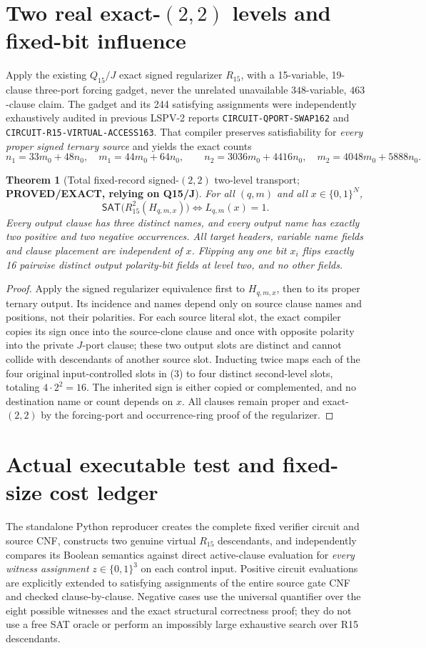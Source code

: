 \documentclass[11pt]{article}
\newtheorem{theorem}{Theorem}
\newcommand{\SAT}{\mathsf{SAT}}
\begin{document}
\section{Two real exact-$(2,2)$ levels and fixed-bit influence}
Apply the existing $Q_{15}/J$ exact signed regularizer $R_{15}$, with a 15-variable, 19-clause three-port forcing gadget, never the unrelated unavailable $348$-variable, $463$-clause claim. The gadget and its 244 satisfying assignments were independently exhaustively audited in previous LSPV-2 reports \texttt{CIRCUIT-QPORT-SWAP162} and \texttt{CIRCUIT-R15-VIRTUAL-ACCESS163}. That compiler preserves satisfiability for \emph{every proper signed ternary source} and yields the exact counts
\[
 n_1=33m_0+48n_0,\quad m_1=44m_0+64n_0,\qquad
 n_2=3036m_0+4416n_0,\quad m_2=4048m_0+5888n_0.\tag{6}
\]
\begin{theorem}[Total fixed-record signed-$(2,2)$ two-level transport; \textbf{PROVED/EXACT, relying on Q15/J}]
For all $(q,m)$ and all $x\in\{0,1\}^N$,
\[
 \SAT\bigl(R_{15}^2(H_{q,m,x})\bigr)\iff L_{q,m}(x)=1.\tag{7}
\]
Every output clause has three distinct names, and every output name has exactly two positive and two negative occurrences. All target headers, variable name fields and clause placement are independent of $x$. Flipping any one bit $x_i$ flips \emph{exactly 16} pairwise distinct output polarity-bit fields at level two, and no other fields.
\end{theorem}
\begin{proof}
Apply the signed regularizer equivalence first to $H_{q,m,x}$, then to its proper ternary output. Its incidence and names depend only on source clause names and positions, not their polarities. For each source literal slot, the exact compiler copies its sign once into the source-clone clause and once with opposite polarity into the private $J$-port clause; these two output slots are distinct and cannot collide with descendants of another source slot. Inducting twice maps each of the four original input-controlled slots in (3) to four distinct second-level slots, totaling $4\cdot2^2=16$. The inherited sign is either copied or complemented, and no destination name or count depends on $x$. All clauses remain proper and exact-$(2,2)$ by the forcing-port and occurrence-ring proof of the regularizer.
\end{proof}

\section{Actual executable test and fixed-size cost ledger}
The standalone Python reproducer creates the complete fixed verifier circuit and source CNF, constructs two genuine virtual $R_{15}$ descendants, and independently compares its Boolean semantics against direct active-clause evaluation for \emph{every witness assignment} $z\in\{0,1\}^3$ on each control input. Positive circuit evaluations are explicitly extended to satisfying assignments of the entire source gate CNF and checked clause-by-clause. Negative cases use the universal quantifier over the eight possible witnesses and the exact structural correctness proof; they do not use a free SAT oracle or perform an impossibly large exhaustive search over R15 descendants.
\end{document}
